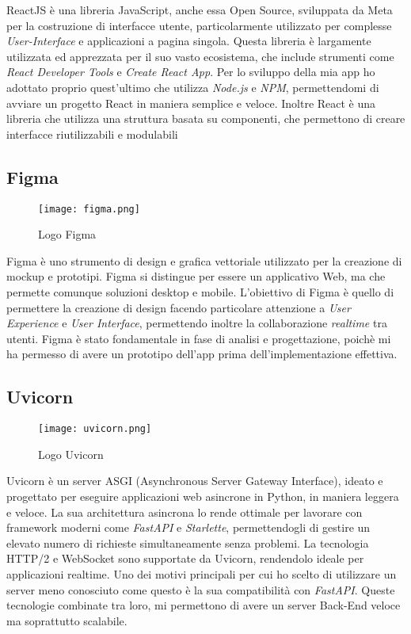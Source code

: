 ReactJS è una libreria JavaScript, anche essa Open Source, sviluppata da Meta per la costruzione di interfacce utente, particolarmente utilizzato per complesse \textit{User-Interface} e applicazioni a pagina singola. Questa libreria è largamente utilizzata ed apprezzata per il suo vasto ecosistema, che include strumenti come \textit{React Developer Tools} e \textit{Create React App}. Per lo sviluppo della mia app ho adottato proprio quest'ultimo che utilizza \textit{Node.js} e \textit{NPM}, permettendomi di avviare un progetto React in maniera semplice e veloce. Inoltre React è una libreria che utilizza una struttura basata su componenti, che permettono di creare interfacce riutilizzabili e modulabili


\subsection{Figma}
\begin{wrapfigure}{r}{0.33\textwidth}
    \centering
    \vspace{-20px}
    \texttt{[image: figma.png]}
    \caption{Logo Figma}
\end{wrapfigure}
    
Figma è uno strumento di design e grafica vettoriale utilizzato per la creazione di mockup e prototipi. Figma si distingue per essere un applicativo Web, ma che permette comunque soluzioni desktop e mobile. L'obiettivo di Figma è quello di permettere la creazione di design facendo particolare attenzione a \textit{User Experience} e \textit{User Interface}, permettendo inoltre la collaborazione \textit{realtime} tra utenti. Figma è stato fondamentale in fase di analisi e progettazione, poichè mi ha permesso di avere un prototipo dell'app prima dell'implementazione effettiva.

\pagebreak


\subsection{Uvicorn}
\begin{wrapfigure}{r}{0.33\textwidth}
    \centering
    \vspace{-10px}
    \texttt{[image: uvicorn.png]}
    \caption{Logo Uvicorn}
\end{wrapfigure}

Uvicorn è un server ASGI (Asynchronous Server Gateway Interface), ideato e progettato per eseguire applicazioni web asincrone in Python, in maniera leggera e veloce. La sua architettura asincrona lo rende ottimale per lavorare con framework moderni come \textit{FastAPI} e \textit{Starlette}, permettendogli di gestire un elevato numero di richieste simultaneamente senza problemi. La tecnologia HTTP/2 e WebSocket sono supportate da Uvicorn, rendendolo ideale per applicazioni realtime. Uno dei motivi principali per cui ho scelto di utilizzare un server meno conosciuto come questo è la sua compatibilità con \textit{FastAPI}. Queste tecnologie combinate tra loro, mi permettono di avere un server Back-End veloce ma soprattutto scalabile. 


